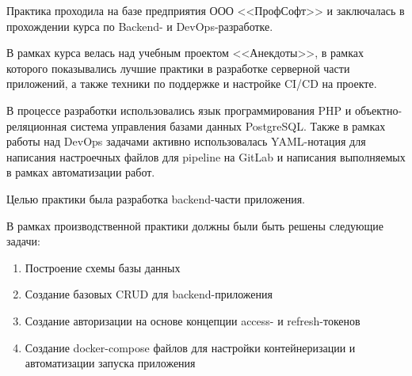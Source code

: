 \documentclass[pract]{SCWorks}
\begin{document}

\date{2024}

\maketitle






\sloppy

\intro{}

Практика проходила на базе предприятия ООО <<ПрофСофт>> и заключалась в 
прохождении курса по Backend- и DevOps-разработке. 

В рамках курса велась над учебным проектом <<Анекдоты>>, в рамках которого
показывались лучшие практики в разработке серверной части приложений, а также
техники по поддержке и настройке CI/CD на проекте.

В процессе разработки использовались язык программирования PHP и
объектно-реляционная система управления базами данных PostgreSQL. Также в
рамках работы над DevOps задачами активно использовалась YAML-нотация для
написания настроечных файлов для pipeline на GitLab и написания 
выполняемых в рамках автоматизации работ.

Целью практики была разработка backend-части приложения.

В рамках производственной практики должны были быть решены следующие задачи:
\begin{enumerate}
    \item Построение схемы базы данных
    \item Создание базовых CRUD для backend-приложения
    \item Создание авторизации на основе концепции access- и refresh-токенов
    \item Создание docker-compose файлов для настройки
    контейнеризации и автоматизации запуска приложения  
\end{enumerate}
\end{document}
